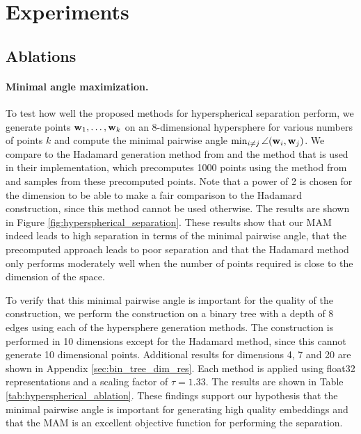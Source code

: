 \section{Experiments}
\label{sec:experiments}
\vspace{-0.1cm}

\subsection{Ablations}
\vspace{-0.1cm}
\paragraph{Minimal angle maximization.}
To test how well the proposed methods for hyperspherical separation perform, we generate points $\mathbf{w}_{1}, \ldots, \mathbf{w}_k$ on an 8-dimensional hypersphere for various numbers of points $k$ and compute the minimal pairwise angle $\min_{i \neq j} \angle (\mathbf{w}_i, \mathbf{w}_j)$. We compare to the Hadamard generation method from \citep{sala2018representation} and the method that is used in their implementation, which precomputes 1000 points using the method from \citep{lovisolo2001uniform} and samples from these precomputed points. Note that a power of 2 is chosen for the dimension to be able to make a fair comparison to the Hadamard construction, since this method cannot be used otherwise. The results are shown in Figure \ref{fig:hyperspherical_separation}. These results show that our MAM indeed leads to high separation in terms of the minimal pairwise angle, that the precomputed approach leads to poor separation and that the Hadamard method only performs moderately well when the number of points required is close to the dimension of the space.

To verify that this minimal pairwise angle is important for the quality of the construction, we perform the construction on a binary tree with a depth of 8 edges using each of the hypersphere generation methods. The construction is performed in 10 dimensions except for the Hadamard method, since this cannot generate 10 dimensional points. Additional results for dimensions 4, 7 and 20 are shown in Appendix \ref{sec:bin_tree_dim_res}. Each method is applied using float32 representations and a scaling factor of $\tau = 1.33$. The results are shown in Table \ref{tab:hyperspherical_ablation}. These findings support our hypothesis that the minimal pairwise angle is important for generating high quality embeddings and that the MAM is an excellent objective function for performing the separation.

